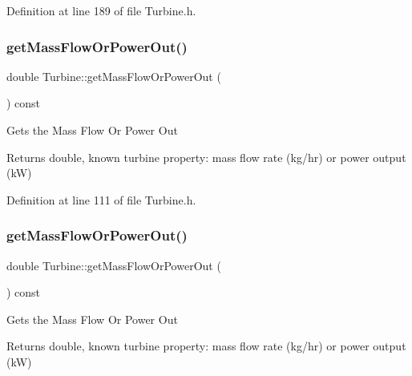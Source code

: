 Definition at line 189 of file Turbine.\+h.

\mbox{\label{class_turbine_a820a090d264b96ee84f717555545c287}} 
\subsubsection{\texorpdfstring{get\+Mass\+Flow\+Or\+Power\+Out()}{getMassFlowOrPowerOut()}\hspace{0.1cm}{\footnotesize\ttfamily [1/3]}}
{\footnotesize\ttfamily double Turbine\+::get\+Mass\+Flow\+Or\+Power\+Out (\begin{DoxyParamCaption}{ }\end{DoxyParamCaption}) const\hspace{0.3cm}{\ttfamily [inline]}}

Gets the Mass Flow Or Power Out

\begin{DoxyReturn}{Returns}
double, known turbine property\+: mass flow rate (kg/hr) or power output (kW) 
\end{DoxyReturn}


Definition at line 111 of file Turbine.\+h.

\mbox{\label{class_turbine_a820a090d264b96ee84f717555545c287}} 
\subsubsection{\texorpdfstring{get\+Mass\+Flow\+Or\+Power\+Out()}{getMassFlowOrPowerOut()}\hspace{0.1cm}{\footnotesize\ttfamily [2/3]}}
{\footnotesize\ttfamily double Turbine\+::get\+Mass\+Flow\+Or\+Power\+Out (\begin{DoxyParamCaption}{ }\end{DoxyParamCaption}) const\hspace{0.3cm}{\ttfamily [inline]}}

Gets the Mass Flow Or Power Out

\begin{DoxyReturn}{Returns}
double, known turbine property\+: mass flow rate (kg/hr) or power output (kW) 
\end{DoxyReturn}


